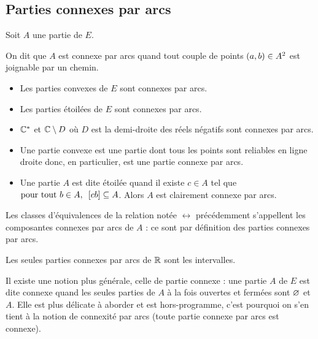 \subsection{Parties connexes par arcs}

\begin{defi}
Soit \(A\) une partie de \(E\).

On dit que \(A\) est connexe par arcs quand tout couple de points \(\left(a,b\right)\in A^2\) est joignable par un chemin.
\end{defi}

\begin{ex}
\begin{itemize}
    \item Les parties convexes de \(E\) sont connexes par arcs. \\
    \item Les parties étoilées de \(E\) sont connexes par arcs. \\
    \item \(\mathbb{C}^*\) et \(\mathbb{C}\setminus D\) où \(D\) est la demi-droite des réels négatifs sont connexes par arcs.
\end{itemize}
\end{ex}

\begin{dem}
\begin{itemize}
    \item Une partie convexe est une partie dont tous les points sont reliables en ligne droite donc, en particulier, est une partie connexe par arcs. \\
    \item Une partie \(A\) est dite étoilée quand il existe \(c\in A\) tel que \(\quantifs{\tpt b\in A}\croch{cb}\subset A\). Alors \(A\) est clairement connexe par arcs.
\end{itemize}
\end{dem}

Les classes d'équivalences de la relation notée \(\rel\) précédemment s'appellent les composantes connexes par arcs de \(A\) : ce sont par définition des parties connexes par arcs.

\begin{prop}
Les seules parties connexes par arcs de \(\mathbb{R}\) sont les intervalles.
\end{prop}

\begin{rem}
Il existe une notion plus générale, celle de partie connexe : une partie \(A\) de \(E\) est dite connexe quand les seules parties de \(A\) à la fois ouvertes et fermées sont \(\varnothing\) et \(A\). Elle est plus délicate à aborder et est hors-programme, c'est pourquoi on s'en tient à la notion de connexité par arcs (toute partie connexe par arcs est connexe).
\end{rem}

